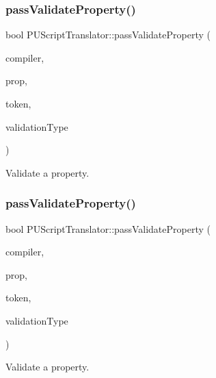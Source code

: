 \subsubsection{\texorpdfstring{pass\+Validate\+Property()}{passValidateProperty()}\hspace{0.1cm}{\footnotesize\ttfamily [1/2]}}
{\footnotesize\ttfamily bool P\+U\+Script\+Translator\+::pass\+Validate\+Property (\begin{DoxyParamCaption}\item[{\hyperlink{classPUScriptCompiler}{P\+U\+Script\+Compiler} $\ast$}]{compiler,  }\item[{\hyperlink{classPUPropertyAbstractNode}{P\+U\+Property\+Abstract\+Node} $\ast$}]{prop,  }\item[{const std\+::string \&}]{token,  }\item[{Validation\+Type}]{validation\+Type }\end{DoxyParamCaption})}

Validate a property. \mbox{\label{classPUScriptTranslator_ab2fc7f172c43c3d64bc05d86ddc1bcb9}} 
\subsubsection{\texorpdfstring{pass\+Validate\+Property()}{passValidateProperty()}\hspace{0.1cm}{\footnotesize\ttfamily [2/2]}}
{\footnotesize\ttfamily bool P\+U\+Script\+Translator\+::pass\+Validate\+Property (\begin{DoxyParamCaption}\item[{\hyperlink{classPUScriptCompiler}{P\+U\+Script\+Compiler} $\ast$}]{compiler,  }\item[{\hyperlink{classPUPropertyAbstractNode}{P\+U\+Property\+Abstract\+Node} $\ast$}]{prop,  }\item[{const std\+::string \&}]{token,  }\item[{Validation\+Type}]{validation\+Type }\end{DoxyParamCaption})}

Validate a property. \mbox{\label{classPUScriptTranslator_a34528983a36a1a977b597354fd2e1db3}} 
